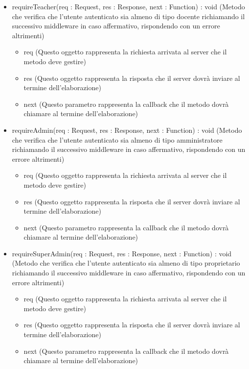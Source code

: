 \begin{description}
\begin{itemize}
\item requireTeacher(req : Request, res : Response, next : Function) : void (Metodo che verifica che l’utente autenticato sia almeno di tipo docente richiamando il successivo middleware in caso affermativo, rispondendo con un errore altrimenti)\begin{itemize}
\item req (Questo oggetto rappresenta la richiesta arrivata al server che il metodo deve gestire)
\item res (Questo oggetto rappresenta la risposta che il server dovrà inviare al termine dell'elaborazione)
\item next (Questo parametro rappresenta la callback che il metodo dovrà chiamare al termine dell’elaborazione)
\end{itemize}

\item requireAdmin(req : Request, res : Response, next : Function) : void (Metodo che verifica che l’utente autenticato sia almeno di tipo amministratore richiamando il successivo middleware in caso affermativo, rispondendo con un errore altrimenti)\begin{itemize}
\item req (Questo oggetto rappresenta la richiesta arrivata al server che il metodo deve gestire)
\item res (Questo oggetto rappresenta la risposta che il server dovrà inviare al termine dell'elaborazione)
\item next (Questo parametro rappresenta la callback che il metodo dovrà chiamare al termine dell’elaborazione)
\end{itemize}

\item requireSuperAdmin(req : Request, res : Response, next : Function) : void (Metodo che verifica che l’utente autenticato sia almeno di tipo proprietario richiamando il successivo middleware in caso affermativo, rispondendo con un errore altrimenti)\begin{itemize}
\item req (Questo oggetto rappresenta la richiesta arrivata al server che il metodo deve gestire)
\item res (Questo oggetto rappresenta la risposta che il server dovrà inviare al termine dell'elaborazione)
\item next (Questo parametro rappresenta la callback che il metodo dovrà chiamare al termine dell’elaborazione)
\end{itemize}

\end{itemize}

\end{description}

